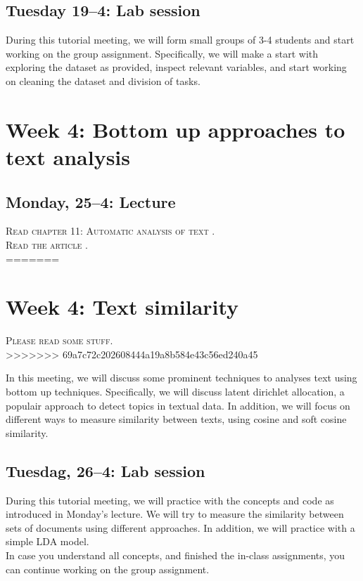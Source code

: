 \subsection*{Tuesday 19--4: Lab session}
During this tutorial meeting, we will form small groups of 3-4 students and start working on the group assignment. Specifically, we will make a start with exploring the dataset as provided, inspect relevant variables, and start working on cleaning the dataset and division of tasks. 

\section*{Week 4: Bottom up approaches to text analysis}

\subsection*{Monday, 25--4: Lecture}
\textsc{Read chapter 11: Automatic analysis of text \cite{van2021computational}.} \\
\textsc{Read the article \cite{Brinberg2021}.} \\
=======
\section*{Week 4: Text similarity}
\textsc{Please read some stuff.}\\
>>>>>>> 69a7c72c202608444a19a8b584e43c56ed240a45

In this meeting, we will discuss some prominent techniques to analyses text using bottom up techniques. Specifically, we will discuss latent dirichlet allocation, a populair approach to detect topics in textual data. In addition, we will focus on different ways to measure similarity between texts, using cosine and soft cosine similarity. 

\subsection*{Tuesdag, 26--4: Lab session}
During this tutorial meeting, we will practice with the concepts and code as introduced in Monday's lecture. We will try to measure the similarity between sets of documents using different approaches. In addition, we will practice with a simple LDA model. \\
In case you understand all concepts, and finished the in-class assignments, you can continue working on the group assignment. 

